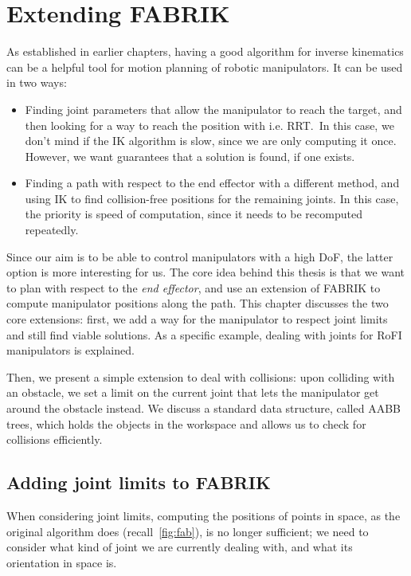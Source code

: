 \chapter{Extending FABRIK}

As established in earlier chapters, having a good algorithm for inverse kinematics can be a helpful tool for motion planning of robotic manipulators. It can be used in two ways:

\begin{itemize}
  \item Finding joint parameters that allow the manipulator to reach the target, and then looking for a way to reach the position with i.e. RRT.\ In this case, we don't mind if the IK algorithm is slow, since we are only computing it once. However, we want guarantees that a solution is found, if one exists.
  \item Finding a path with respect to the end effector with a different method, and using IK to find collision-free positions for the remaining joints. In this case, the priority is speed of computation, since it needs to be recomputed repeatedly.
\end{itemize}

Since our aim is to be able to control manipulators with a high DoF, the latter option is more interesting for us. The core idea behind this thesis is that we want to plan with respect to the \textit{end effector}, and use an extension of FABRIK to compute manipulator positions along the path. This chapter discusses the two core extensions: first, we add a way for the manipulator to respect joint limits and still find viable solutions. As a specific example, dealing with joints for RoFI manipulators is explained.

Then, we present a simple extension to deal with collisions: upon colliding with an obstacle, we set a limit on the current joint that lets the manipulator get around the obstacle instead. We discuss a standard data structure, called AABB trees, which holds the objects in the workspace and allows us to check for collisions efficiently.

\section{Adding joint limits to FABRIK}

When considering joint limits, computing the positions of points in space, as the original algorithm does (recall~\ref{fig:fab}), is no longer sufficient; we need to consider what kind of joint we are currently dealing with, and what its orientation in space is.

